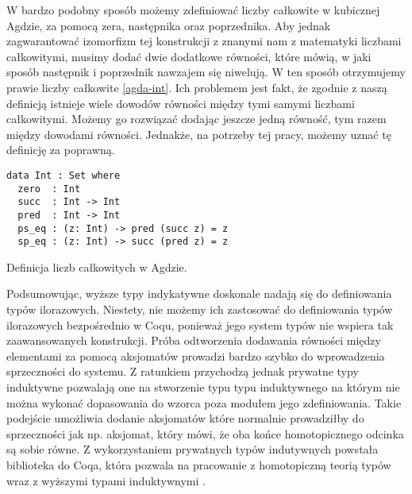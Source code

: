 W bardzo podobny sposób możemy zdefiniować liczby całkowite w kubicznej Agdzie, za pomocą zera, następnika oraz poprzednika. Aby jednak zagwarantować izomorfizm tej konstrukcji z znanymi nam z matematyki liczbami całkowitymi, musimy dodać dwie dodatkowe równości, które mówią, w jaki sposób następnik i poprzednik nawzajem się niwelują. W ten sposób otrzymujemy prawie liczby całkowite \ref{agda-int}. Ich problemem jest fakt, że zgodnie z naszą definicją istnieje wiele dowodów równości między tymi samymi liczbami całkowitymi. Możemy go rozwiązać dodając jeszcze jedną równość, tym razem między dowodami równości. Jednakże, na potrzeby tej pracy, możemy uznać tę definicję za poprawną.
\begin{code}
\begin{verbatim}
data Int : Set where
  zero  : Int
  succ  : Int -> Int
  pred  : Int -> Int
  ps_eq : (z: Int) -> pred (succ z) = z
  sp_eq : (z: Int) -> succ (pred z) = z
\end{verbatim}
\caption{Definicja liczb całkowitych w Agdzie.}
\label{agda-int}
\end{code}

Podsumowując, wyższe typy indykatywne doskonale nadają się do definiowania typów ilorazowych. Niestety, nie możemy ich zastosować do definiowania typów ilorazowych bezpośrednio w Coqu, ponieważ jego system typów nie wspiera tak zaawansowanych konstrukcji. Próba odtworzenia dodawania równości między elementami za pomocą aksjomatów prowadzi bardzo szybko do wprowadzenia sprzeczności do systemu. Z ratunkiem przychodzą jednak prywatne typy induktywne\cite{PrivetInductive} pozwalają one na stworzenie typu typu induktywnego na którym nie można wykonać dopasowania do wzorca poza modułem jego zdefiniowania. Takie podejście umożliwia dodanie aksjomatów które normalnie prowadziłby do sprzeczności jak np. aksjomat, który mówi, że oba końce homotopicznego odcinka są sobie równe. Z wykorzystaniem prywatnych typów indutywnych powstała biblioteka do Coqa, która pozwala na pracowanie z homotopiczną teorią typów wraz z wyższymi typami induktywnymi \cite{HoTTinCoq}. 